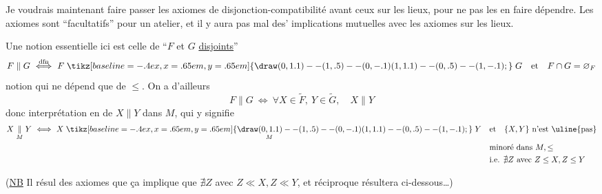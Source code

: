 Je voudrais maintenant faire passer les axiomes de disjonction-compatibilité avant ceux sur les lieux, pour ne pas  les en faire dépendre. Les axiomes sont ``facultatifs'' pour un atelier, et il y aura pas mal des' implications mutuelles avec les axiomes sur les lieux.

Une notion essentielle ici est celle de ``$F$ et $G$ \uline{disjoints}''
\[
 F\parallel G\ \overset{\mathrm{dfn}}{\Longleftrightarrow}\ F\mathrel{\tikz[baseline=-.4ex,x=.65em,y=.65em]{\draw (0,1.1)--(1,.5)--(0,-.1) (1,1.1)--(0,.5)--(1,-.1);}}G\quad\text{et}\quad F\cap G=\varnothing_F
\]
notion qui ne dépend que de $\leq$. On a d'ailleurs
\[
 F\parallel G\ \Longleftrightarrow\ \forall X\in\widetilde F,\ Y\in\widetilde G,\quad X\parallel Y
\]
donc interprétation en  de $X\parallel Y$ dans $M$, qui y signifie
\[
\begin{aligned}
X\mathrel{\underset{M}{\parallel}}Y\ \Longleftrightarrow\
 X\mathrel{\underset{M}{\mathrel{\tikz[baseline=-.4ex,x=.65em,y=.65em]{\draw (0,1.1)--(1,.5)--(0,-.1) (1,1.1)--(0,.5)--(1,-.1);}}}}Y\quad &\text{et}\quad\{X,Y\}\ \text{n'est \uline{pas}}\\
&\text{minoré dans } M,\leq\\
&\text{i.e. }\nexists Z\ \text{avec }Z\leq X,Z\leq Y
\end{aligned}
\]

(\uline{NB} Il résul\deleted{\unsure{tera}}\inserted{te} des axiomes  que ça implique que $\nexists Z$ avec $Z\ll X,Z\ll Y$,  et  réciproque résultera  ci-dessous\ldots)

